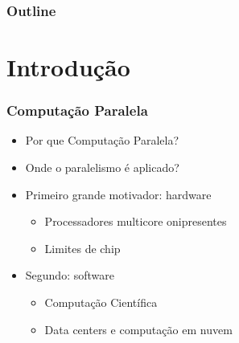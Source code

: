 \documentclass[xcolor={usenames,dvipsnames},12pt,presentation,aspectratio=169]{beamer}
\title[\titulo]{\titulo}
\subtitle{\disciplina}
\author[João V. F. Lima]{\nome}
\institute[UFSM]{Universidade Federal de Santa Maria \\ \url{jvlima@inf.ufsm.br} \\ \url{http://www.inf.ufsm.br/~jvlima}}
\date{2023/1}
\begin{document}
\begin{frame}
  \maketitle
\end{frame}

\begin{frame}
    \frametitle{Outline}
    \tableofcontents[hideallsubsections]
\end{frame}


\section{Introdução}
\begin{frame}
  \frametitle{Computação Paralela}
    \begin{itemize}
        \item Por que Computação Paralela?
        \item Onde o paralelismo é aplicado?
        \item Primeiro grande motivador: hardware
            \begin{itemize}
                \item Processadores multicore onipresentes
                \item Limites de chip
            \end{itemize}
        \item Segundo: software
            \begin{itemize}
                \item Computação Científica
                \item Data centers e computação em nuvem
            \end{itemize}
    \end{itemize}
\end{frame}
\end{document}
